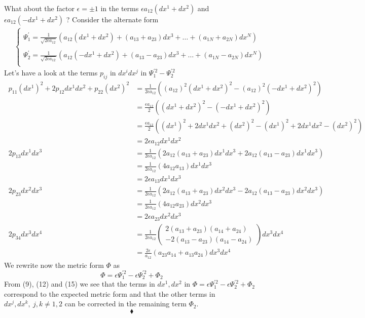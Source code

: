 What about the factor $\epsilon = \pm1$ in the terms $\epsilon a_{12}(dx^1+ dx^2)$ and $\epsilon a_{12}(-dx^1+ dx^2)$ ? Consider the alternate form
\begin{align*}
\ &\left \{ \begin{array}{l} \\
\Psi^{'}_1 = \frac{1}{\sqrt{2 \epsilon a_{12}}}\left( a_{12}(dx^1+ dx^2) + (a_{13}+a_{23})dx^3+ \dots +(a_{1N}+a_{2N})dx^N \right) \\\\
\Psi^{'}_2 = \frac{1}{\sqrt{2 \epsilon a_{12}}}\left(  a_{12}(- dx^1+ dx^2) + (a_{13}-a_{23})dx^3+ \dots +(a_{1N}-a_{2N})dx^N \right) \\
\end{array}\right.
\end{align*}
Let's have a look at the terms $p_{ij}$ in $dx^idx^j$ in $\Psi_1^{'2}-\Psi^{'2}_2$\\
\begin{align}
\ p_{11}(dx^1)^2+ 2p_{12}dx^1dx^2+p_{22}(dx^2)^2&= \frac{1}{2 \epsilon a_{12}}\left(( a_{12})^2(dx^1 + dx^2)^2 - ( a_{12})^2(-dx^1 + dx^2)^2\right)  \\
&= \frac{\epsilon a_{12}}{2}\left((dx^1 +  dx^2)^2 - (- dx^1 + dx^2)^2\right)  \\
&= \frac{\epsilon a_{12}}{2}\left((dx^1)^2 + 2 dx^1dx^2+  (dx^2)^2 - (dx^1)^2 + 2 dx^1dx^2-  (dx^2)^2\right)  \\
&= 2 \epsilon a_{12}dx^1dx^2 \\
\ 2p_{13}dx^1dx^3&= \frac{1}{2 \epsilon a_{12}}(2 a_{12}(a_{13}+a_{23})dx^1dx^3 + 2a_{12}(a_{13}-a_{23})dx^1dx^3) \\
\ &= \frac{1}{2 \epsilon a_{12}}(4 a_{12}a_{13})dx^1dx^3 \\
 & =  2\epsilon a_{13}dx^1dx^3\\
 \ 2p_{23}dx^2dx^3&= \frac{1}{2 \epsilon a_{12}}(2 a_{12}(a_{13}+a_{23})dx^2dx^3 - 2 a_{12}(a_{13}-a_{23})dx^2dx^3) \\
\ &= \frac{1}{2 \epsilon a_{12}}(4 a_{12}a_{23})dx^2dx^3 \\
 & =  2\epsilon a_{23}dx^2dx^3\\
\ 2p_{34}dx^3dx^4&=  \frac{1}{2 \epsilon a_{12}}\left(\begin{array}{l} 2 (a_{13}+ a_{23})(a_{14}+ a_{24})\\ - 2 (a_{13}- a_{23})(a_{14}- a_{24}) \end{array} \right)dx^3dx^4 \\
\ &= \frac{2\epsilon}{ a_{12}}\left(a_{23}a_{14}+a_{13}a_{24}\right)dx^3dx^4
\end{align}
We rewrite now the metric form $\Phi$ as 
$$\Phi =\epsilon \Psi_1^{'2}- \epsilon \Psi^{'2}_2 + \Phi_2 $$
From (9), (12) and (15) we see that the terms in $dx^1, dx^2$ in $\Phi =\epsilon \Psi_1^{'2}- \epsilon \Psi^{'2}_2 + \Phi_2$ correspond to the expected  metric form and that the other terms in $dx^j, dx^k, \ j,k \neq 1,2$ can be corrected in the remaining term $\Phi_2$.
$$\blacklozenge$$
\newpage

